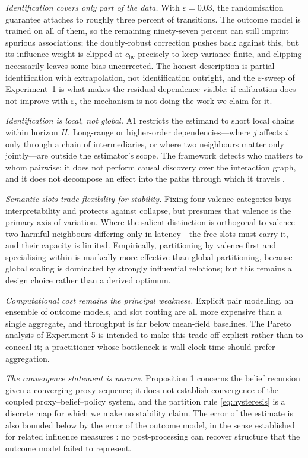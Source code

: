 \documentclass[conference]{IEEEtran}
\begin{document}
\emph{Identification covers only part of the data.} With $\varepsilon=0.03$, the randomisation guarantee attaches to roughly three percent of transitions. The outcome model is trained on all of them, so the remaining ninety-seven percent can still imprint spurious associations; the doubly-robust correction pushes back against this, but its influence weight is clipped at $c_{\mathrm{iw}}$ precisely to keep variance finite, and clipping necessarily leaves some bias uncorrected. The honest description is partial identification with extrapolation, not identification outright, and the $\varepsilon$-sweep of Experiment~1 is what makes the residual dependence visible: if calibration does not improve with $\varepsilon$, the mechanism is not doing the work we claim for it.

\emph{Identification is local, not global.} A1 restricts the estimand to short local chains within horizon $H$. Long-range or higher-order dependencies---where $j$ affects $i$ only through a chain of intermediaries, or where two neighbours matter only jointly---are outside the estimator's scope. The framework detects who matters to whom pairwise; it does not perform causal discovery over the interaction graph, and it does not decompose an effect into the paths through which it travels \cite{triantafyllou2024ase}.

\emph{Semantic slots trade flexibility for stability.} Fixing four valence categories buys interpretability and protects against collapse, but presumes that valence is the primary axis of variation. Where the salient distinction is orthogonal to valence---two harmful neighbours differing only in latency---the free slots must carry it, and their capacity is limited. Empirically, partitioning by valence first and specialising within is markedly more effective than global partitioning, because global scaling is dominated by strongly influential relations; but this remains a design choice rather than a derived optimum.

\emph{Computational cost remains the principal weakness.} Explicit pair modelling, an ensemble of outcome models, and slot routing are all more expensive than a single aggregate, and throughput is far below mean-field baselines. The Pareto analysis of Experiment 5 is intended to make this trade-off explicit rather than to conceal it; a practitioner whose bottleneck is wall-clock time should prefer aggregation.

\emph{The convergence statement is narrow.} Proposition 1 concerns the belief recursion given a converging proxy sequence; it does not establish convergence of the coupled proxy--belief--policy system, and the partition rule \eqref{eq:hysteresis} is a discrete map for which we make no stability claim. The error of the estimate is also bounded below by the error of the outcome model, in the sense established for related influence measures \cite{pieroth2024influence}: no post-processing can recover structure that the outcome model failed to represent.
\end{document}
